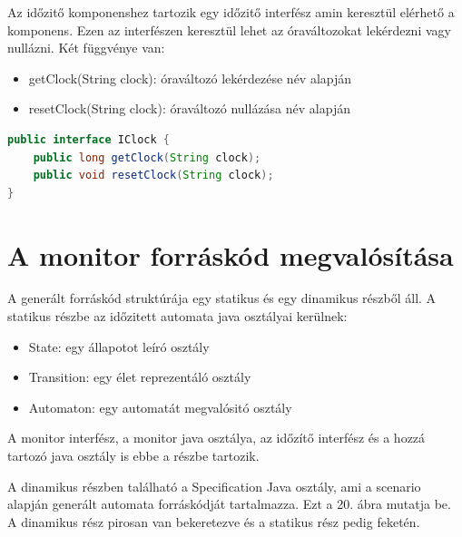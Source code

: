 Az időzitő komponenshez tartozik egy időzitő interfész amin keresztül elérhető a komponens. Ezen az interfészen keresztül lehet az óraváltozokat lekérdezni vagy nullázni. Két függvénye van:
\begin{itemize}
    \item getClock(String clock): óraváltozó lekérdezése név alapján
    \item resetClock(String clock): óraváltozó nullázása név alapján
\end{itemize}

\begin{lstlisting}[language=java,frame=single, float=h!, caption={Időzitő interfész Java implementációja.},captionpos=b]
public interface IClock {
	public long getClock(String clock);
	public void resetClock(String clock);
}
\end{lstlisting}

\section{A monitor forráskód megvalósítása}
A generált forráskód struktúrája egy statikus és egy dinamikus részből áll.
A statikus részbe az időzitett automata java osztályai kerülnek:
\begin{itemize}
    \item State: egy állapotot leíró osztály
    \item Transition: egy élet reprezentáló osztály
    \item Automaton: egy automatát megvalósitó osztály
\end{itemize}

A monitor interfész, a monitor java osztálya, az időzítő interfész és a hozzá tartozó java osztály is ebbe a részbe tartozik.

A dinamikus részben található a Specification Java osztály, ami a scenario alapján generált automata forráskódját tartalmazza. Ezt a 20. ábra mutatja be. A dinamikus rész pirosan van bekeretezve és a statikus rész pedig feketén.

